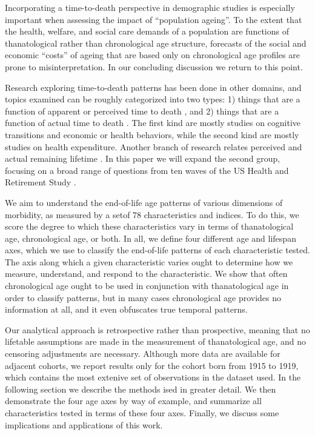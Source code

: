 \documentclass[11pt,oneside,a4paper]{article}
\begin{document}
Incorporating a time-to-death perspective in demographic studies is especially
important when assessing the impact of ``population ageing''.
To the extent that the health, welfare, and social care demands of a
population are functions of thanatological rather than chronological age
structure, forecasts of the social and economic ``costs'' of ageing that are
based only on chronological age profiles are prone to misinterpretation.
In our concluding discussion we return to this point.

Research exploring time-to-death patterns has been done in other
domains, and topics examined can be roughly categorized into two types: 1) things that are a
function of apparent or perceived time to death
\citep{hamermesh1985expectations,hurd1995evaluation,carstensen2006influence,gan2004subjective,biro2010subjective,salm2010subjective,van2010living,cocco2012longevity,payne2013life,balia2013survival},
and 2) things that are a function of actual time to death
\citep{miller2001increasing,seshamani2004longitudinal,werblow2007population}.
The first kind are mostly studies on cognitive transitions and economic or
health behaviors, while the second kind are mostly studies on health
expenditure.
Another branch of research relates perceived and actual remaining lifetime
\citep{perozek2008using,delavande2011differential,post2012longevity,kutlu2013individuals}.
In this paper we will expand the second group, focusing on a broad range of
questions from ten waves of the US Health and Retirement Study \citep{HRS}.

We aim to understand the end-of-life age patterns of various dimensions of
morbidity, as measured by a setof 78 characteristics and indices. To do this, we
score the degree to which these characteristics vary in terms of thanatological
age, chronological age, or both. In all, we define four different age and
lifespan axes, which we use to classify the end-of-life patterns of each
characteristic tested. The axis along which a given characteristic varies ought
to determine how we measure, understand, and respond to the characteristic. We show that often chronological age ought to be used in conjunction with
thanatological age in order to classify patterns, but in many cases
chronological age provides no information at all, and it even obfuscates true temporal
patterns.

Our analytical approach is retrospective rather than
prospective, meaning that no lifetable assumptions are made in the measurement
of thanatological age, and no censoring adjustments are necessary. Although more
data are available for adjacent cohorts, we report results only for the cohort
born from 1915 to 1919, which contains the most extenive set of observations in
the dataset used. In the following section we describe the methods ised in
greater detail. We then demonstrate the four age axes by way of example,
and summarize all characteristics tested in terms of these four axes. Finally,
we discuss some implications and applications of this work.
\end{document}
